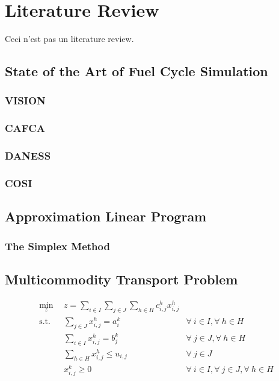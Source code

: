 \chapter{Literature Review}\label{ch:litreview}

Ceci n'est pas un literature review. 

\section{State of the Art of Fuel Cycle Simulation}\label{sec:simulators}

\subsection{VISION}
\subsection{CAFCA}
\subsection{DANESS}
\subsection{COSI}

\section{Approximation Linear Program}

\subsection{The Simplex Method}

\section{Multicommodity Transport Problem}\label{sec:MCTP}

\begin{subequations}\label{eqs:MCTP}
  \begin{align}
    \min_{z} \:\: & 
    z = \sum_{i \in I}\sum_{j \in J}\sum_{h \in H} c_{i,j}^{h} x_{i,j}^{h}
    & \label{eqs:MCTP_obj} \\
    \text{s.t.} \:\: &
    \sum_{j \in J} x_{i,j}^{h} = a_{i}^{k}
    &
    \forall \: i \in I, \forall \: h \in H \label{eqs:MCTP_sup} \\
    &
    \sum_{i \in I} x_{i,j}^{h} = b_{j}^{k}
    & 
    \forall \: j \in J, \forall \: h \in H \label{eqs:MCTP_dem} \\
    &
    \sum_{h \in H} x_{i,j}^{h} \leq u_{i,j}
    & 
    \forall \: j \in J \label{eqs:MCTP_cap} \\
    &
    x_{i,j}^{k} \geq 0
    &
    \forall \: i \in I, \forall \: j \in J, \forall \: h \in H \label{eqs:MCTP_x}
  \end{align}
\end{subequations}


